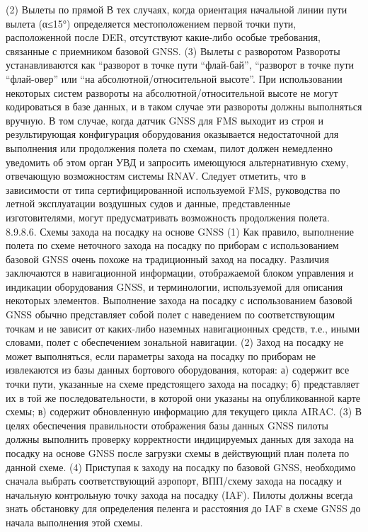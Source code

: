 (2) Вылеты по прямой 
В тех случаях, когда ориентация начальной линии пути вылета (α≤15°) определяется местоположением первой точки пути, расположенной после DER, отсутствуют какие-либо особые требования, связанные с приемником базовой GNSS.
(3) Вылеты с разворотом 
Развороты устанавливаются как “разворот в точке пути “флай-бай”, “разворот в точке пути “флай-овер” или “на абсолютной/относительной высоте”. При использовании некоторых систем развороты на абсолютной/относительной высоте не могут кодироваться в базе данных, и в таком случае эти развороты должны выполняться вручную.
В том случае, когда датчик GNSS для FMS выходит из строя и результирующая конфигурация оборудования оказывается недостаточной для выполнения или продолжения полета по схемам, пилот должен немедленно уведомить об этом орган УВД и запросить имеющуюся альтернативную схему, отвечающую возможностям системы RNAV. Следует отметить, что в зависимости от типа сертифицированной используемой FMS, руководства по летной эксплуатации воздушных судов и данные, представленные изготовителями, могут предусматривать возможность продолжения полета.
8.9.8.6.	Схемы захода на посадку на основе GNSS
(1) Как правило, выполнение полета по схеме неточного захода на посадку по приборам с использованием базовой GNSS очень похоже на традиционный заход на посадку. Различия заключаются в навигационной информации, отображаемой блоком управления и индикации оборудования GNSS, и терминологии, используемой для описания некоторых элементов. Выполнение захода на посадку с использованием базовой GNSS обычно представляет собой полет с наведением по соответствующим точкам и не зависит от каких-либо наземных навигационных средств, т.е., иными словами, полет с обеспечением зональной навигации.
(2) Заход на посадку не может выполняться, если параметры захода на посадку по приборам не извлекаются из базы данных бортового оборудования, которая:
а)	содержит все точки пути, указанные на схеме предстоящего захода на посадку;
б)	представляет их в той же последовательности, в которой они указаны на опубликованной карте схемы;
в)	содержит обновленную информацию для текущего цикла AIRAC.
(3) В целях обеспечения правильности отображения базы данных GNSS пилоты должны выполнить проверку корректности индицируемых данных для захода на посадку на основе GNSS после загрузки схемы в действующий план полета по данной схеме. 
(4) Приступая к заходу на посадку по базовой GNSS, необходимо сначала выбрать соответствующий аэропорт, ВПП/схему захода на посадку и начальную контрольную точку захода на посадку (IAF). Пилоты должны всегда знать обстановку для определения пеленга и расстояния до IAF в схеме GNSS до начала выполнения этой схемы. 
